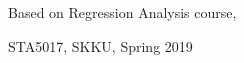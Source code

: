 \begin{titlepage}
  
\end{titlepage}

\let\maketitle\oldmaketitle
\maketitle

\thispagestyle{empty}

\begin{center}
Based on Regression Analysis course,

STA5017, SKKU, Spring 2019
\end{center}
